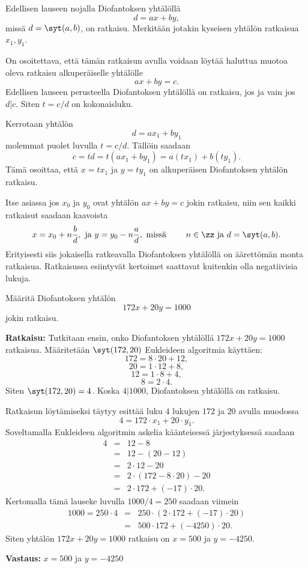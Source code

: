 
\begin{todistus}
Edellisen lauseen nojalla Diofantoksen yhtälöllä
\[
d= a x + b y,
\]
missä $d=\syt(a, b)$, on ratkaisu. Merkitään jotakin kyseisen yhtälön ratkaisua $x_1, y_1$.

On osoitettava, että tämän ratkaisun avulla voidaan löytää haluttua muotoa oleva ratkaisu alkuperäiselle yhtälölle
\[
a x + b y = c.
\]
Edellisen lauseen perusteella Diofantoksen yhtälöllä on ratkaisu, jos ja vain jos $d|c$. Siten $t=c/d$ on kokonaisluku.

Kerrotaan yhtälön
\[
d= a x_1 + b y_1
\]
molemmat puolet luvulla $t=c/d$. Tällöin saadaan
\[
c=td=t(a x_1 + b y_1) = a(tx_1)+ b(ty_1).
\]
Tämä osoittaa, että $x=tx_1$ ja $y=ty_1$ on alkuperäisen Diofantoksen yhtälön ratkaisu.
\end{todistus}

Itse asiassa jos $x_0$ ja $y_0$ ovat yhtälön $ax + by = c$ jokin ratkaisu, niin sen kaikki ratkaisut saadaan kaavoista
\[
x= x_0 + n\frac{b}{d}, \textrm{ ja } y=y_0 - n\frac{a}{d}, \textrm{ missä } \qquad n\in\zz \textrm{ ja } d=\syt(a, b).
\]
Erityisesti siis jokaisella ratkeavalla Diofantoksen yhtälöllä on äärettömän monta ratkaisua. Ratkaisussa esiintyvät kertoimet saattavat kuitenkin olla negatiivisia lukuja.

\begin{esimerkki}
Määritä Diofantoksen yhtälön
\[
172x + 20y = 1000
\]
jokin ratkaisu.

{\bf Ratkaisu:} Tutkitaan ensin, onko Diofantoksen yhtälöllä $172x + 20y = 1000$ ratkaisua. Määritetään $\syt(172, 20)$ Eukleideen algoritmia käyttäen:
\[
172 = 8 \cdot 20 +12,
\]
\[
20 = 1\cdot 12 + 8,
\]
\[
12 = 1 \cdot 8 +4,
\]
\[
8=2\cdot 4.
\]
Siten $\syt(172, 20)=4$. Koska $4|1000$, Diofantoksen yhtälöllä on ratkaisu.

Ratkaisun löytämiseksi täytyy esittää luku $4$ lukujen $172$ ja $20$ avulla muodossa 
\[
4=172\cdot x_1 + 20 \cdot y_1.
\]
Soveltamalla Eukleideen algoritmin askelia käänteisessä järjestyksessä saadaan
\begin{eqnarray*}
4 &=& 12 - 8\\
  &=& 12-(20-12) \\
  &=& 2\cdot 12-20 \\
  &=& 2 \cdot (172-8\cdot 20)-20 \\
  &=& 2\cdot 172 +(-17) \cdot 20.
\end{eqnarray*}
Kertomalla tämä lauseke luvulla $1000/4=250$ saadaan viimein
\begin{eqnarray*}
1000 = 250\cdot 4 &=& 250 \cdot (2\cdot 172 +(-17) \cdot 20) \\
 &=& 500\cdot 172 + (-4250) \cdot 20.
\end{eqnarray*}
Siten yhtälön $172x + 20y = 1000$ ratkaisu on $x=500$ ja $y=-4250$.

{\bf Vastaus:} $x=500$ ja $y=-4250$
\end{esimerkki}

